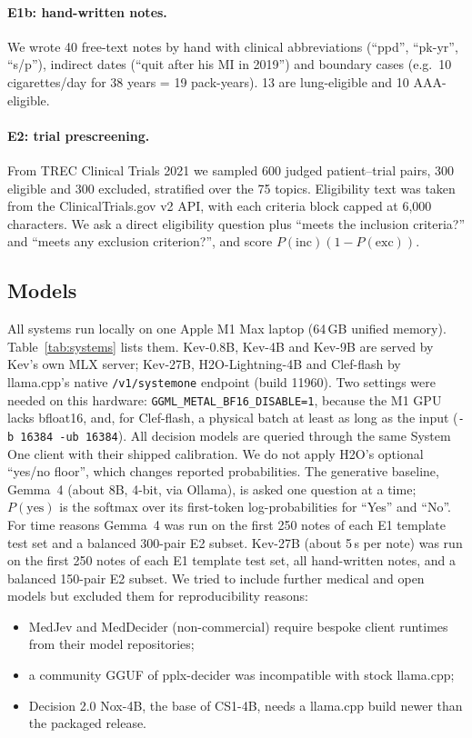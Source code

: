 \documentclass[11pt]{article}
\begin{document}
\paragraph{E1b: hand-written notes.}
We wrote 40 free-text notes by hand with clinical abbreviations (``ppd'', ``pk-yr'', ``s/p''), indirect dates (``quit after his MI in 2019'') and boundary cases (e.g.\ 10 cigarettes/day for 38 years = 19 pack-years). 13 are lung-eligible and 10 AAA-eligible.
\paragraph{E2: trial prescreening.}
From TREC Clinical Trials 2021 \citep{roberts2021trec} we sampled 600 judged patient--trial pairs, 300 eligible and 300 excluded, stratified over the 75 topics.
Eligibility text was taken from the ClinicalTrials.gov v2 API, with each criteria block capped at 6{,}000 characters.
We ask a direct eligibility question plus ``meets the inclusion criteria?'' and ``meets any exclusion criterion?'', and score $P(\text{inc})(1-P(\text{exc}))$.

\subsection{Models}
\label{sec:systems}
All systems run locally on one Apple M1 Max laptop (64\,GB unified memory). Table~\ref{tab:systems} lists them.
Kev-0.8B, Kev-4B and Kev-9B are served by Kev's own MLX server; Kev-27B, H2O-Lightning-4B and Clef-flash by llama.cpp's native \texttt{/v1/systemone} endpoint (build 11960). Two settings were needed on this hardware: \nolinkurl{GGML_METAL_BF16_DISABLE=1}, because the M1 GPU lacks bfloat16, and, for Clef-flash, a physical batch at least as long as the input (\nolinkurl{-b 16384 -ub 16384}).
All decision models are queried through the same System One client with their shipped calibration.
We do not apply H2O's optional ``yes/no floor'', which changes reported probabilities.
The generative baseline, Gemma~4 (about 8B, 4-bit, via Ollama), is asked one question at a time; $P(\text{yes})$ is the softmax over its first-token log-probabilities for ``Yes'' and ``No''.
For time reasons Gemma~4 was run on the first 250 notes of each E1 template test set and a balanced 300-pair E2 subset. Kev-27B (about 5\,s per note) was run on the first 250 notes of each E1 template test set, all hand-written notes, and a balanced 150-pair E2 subset.
We tried to include further medical and open models but excluded them for reproducibility reasons:
\begin{itemize}[nosep]
\item MedJev \citep{medjev_weights} and MedDecider (non-commercial) require bespoke client runtimes from their model repositories;
\item a community GGUF of pplx-decider was incompatible with stock llama.cpp;
\item Decision 2.0 Nox-4B, the base of CS1-4B, needs a llama.cpp build newer than the packaged release.
\end{itemize}
\end{document}
